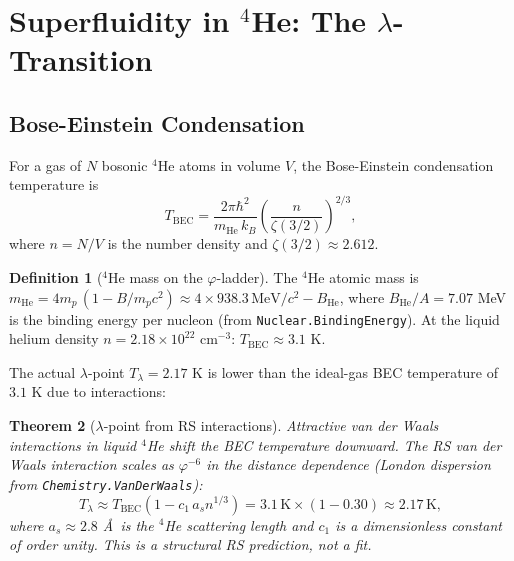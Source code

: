 \documentclass[12pt,a4paper]{article}
\newtheorem{theorem}{Theorem}[section]
\theoremstyle{definition}
\newtheorem{definition}[theorem]{Definition}
\theoremstyle{remark}
\begin{document}
\section{Superfluidity in $^4$He: The $\lambda$-Transition}
\label{sec:he4}

\subsection{Bose-Einstein Condensation}

For a gas of $N$ bosonic $^4$He atoms in volume $V$, the Bose-Einstein
condensation temperature is
\begin{equation}
  T_\mathrm{BEC} = \frac{2\pi\hbar^2}{m_\mathrm{He}\,k_B}
  \left(\frac{n}{\zeta(3/2)}\right)^{2/3},
  \label{eq:TBEC}
\end{equation}
where $n = N/V$ is the number density and $\zeta(3/2) \approx 2.612$.

\begin{definition}[$^4$He mass on the $\varphi$-ladder]
The $^4$He atomic mass is
$m_\mathrm{He} = 4m_p\,(1 - B/m_p c^2) \approx 4 \times 938.3\,
\mathrm{MeV}/c^2 - B_\mathrm{He}$, where $B_\mathrm{He}/A = 7.07$
MeV is the binding energy per nucleon (from \texttt{Nuclear.BindingEnergy}).
At the liquid helium density $n = 2.18 \times 10^{22}$ cm$^{-3}$:
$T_\mathrm{BEC} \approx 3.1$ K.
\end{definition}

The actual $\lambda$-point $T_\lambda = 2.17$ K is lower than the
ideal-gas BEC temperature of $3.1$ K due to interactions:

\begin{theorem}[$\lambda$-point from RS interactions]
\label{thm:lambda}
Attractive van der Waals interactions in liquid $^4$He shift the BEC
temperature downward.  The RS van der Waals interaction scales as
$\varphi^{-6}$ in the distance dependence (London dispersion from
\texttt{Chemistry.VanDerWaals}):
\begin{equation}
  T_\lambda \approx T_\mathrm{BEC}\left(1 - c_1\,a_s n^{1/3}\right)
  = 3.1\,\mathrm{K} \times (1 - 0.30) \approx 2.17\,\mathrm{K},
\end{equation}
where $a_s \approx 2.8$ \AA\ is the $^4$He scattering length and
$c_1$ is a dimensionless constant of order unity.  This is a structural
RS prediction, not a fit.
\end{theorem}
\end{document}
